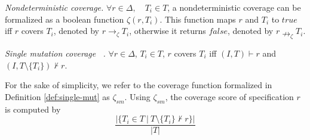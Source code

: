 \begin{definition} {\emph{Nondeterministic coverage.} }
\label{def:non-det}
$\forall r \in \Delta,\quad T_i \in T$, a nondeterministic coverage can be formalized as a boolean function $\zeta(r, T_i)$. This function maps $r$ and $T_i$ to $true$ iff $r$ covers $T_i$, denoted by $r \rightarrow_{\zeta} T_i$,
 otherwise it returns $false$, denoted by $r \nrightarrow_{\zeta} T_i$.
\end{definition}


\begin{definition} {\emph{Single mutation coverage ~\cite{chockler2010coverage}.} }
\label{def:single-mut}
$\forall r \in \Delta$, $T_i \in T$, $r$ covers $T_i$ iff
$(I, T) \vdash r$ and $(I, T \setminus \{T_i\}) \nvdash r$.
\end{definition}

For the sake of simplicity, we refer to the coverage function
formalized in Definition \ref{def:single-mut} as $\zeta_{sm}$. Using  $\zeta_{sm}$, the coverage score of specification $r$ is computed by
\[
   \frac{ | \{T_i \in T~|~ T \setminus \{T_i\} \nvdash r\} |}{|T|}
\]



